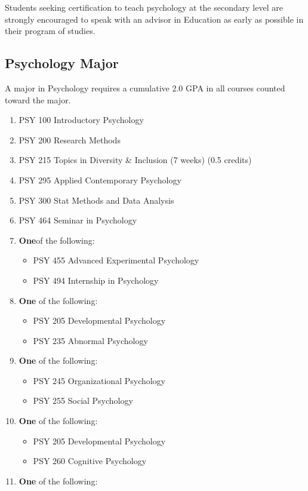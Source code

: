 \documentclass[
  letterpaper,
]{scrbook}
\providecommand{\tightlist}{%
  \setlength{\itemsep}{0pt}\setlength{\parskip}{0pt}}
\begin{document}
Students seeking certification to teach psychology at the secondary
level are strongly encouraged to speak with an advisor in Education as
early as possible in their program of studies.

\subsection{Psychology Major}\label{psychology-major}

A major in Psychology requires a cumulative 2.0 GPA in all courses
counted toward the major.

\begin{enumerate}
\def\labelenumi{\arabic{enumi}.}
\item
  PSY 100 Introductory Psychology
\item
  PSY 200 Research Methods
\item
  PSY 215 Topics in Diversity \& Inclusion (7 weeks) (0.5 credits)
\item
  PSY 295 Applied Contemporary Psychology
\item
  PSY 300 Stat Methods and Data Analysis
\item
  PSY 464 Seminar in Psychology
\item
  \textbf{One}of the following:

  \begin{itemize}
  \tightlist
  \item
    PSY 455 Advanced Experimental Psychology
  \item
    PSY 494 Internship in Psychology
  \end{itemize}
\item
  \textbf{One} of the following:

  \begin{itemize}
  \tightlist
  \item
    PSY 205 Developmental Psychology
  \item
    PSY 235 Abnormal Psychology
  \end{itemize}
\item
  \textbf{One} of the following:

  \begin{itemize}
  \tightlist
  \item
    PSY 245 Organizational Psychology
  \item
    PSY 255 Social Psychology
  \end{itemize}
\item
  \textbf{One} of the following:

  \begin{itemize}
  \tightlist
  \item
    PSY 205 Developmental Psychology
  \item
    PSY 260 Cognitive Psychology
  \end{itemize}
\item
  \textbf{One} of the following:


\end{enumerate}
\end{document}
